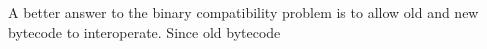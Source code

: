 A better answer to the binary compatibility problem is to allow old and new bytecode to interoperate. Since old bytecode    






